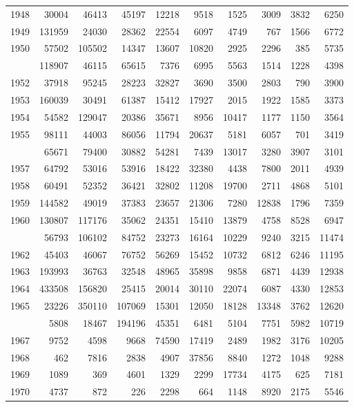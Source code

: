 \documentclass[
]{article}
\begin{document}
\begin{longtable}[t]{lrrrrrrrrr}
1948 & 30004 & 46413 & 45197 & 12218 & 9518 & 1525 & 3009 & 3832 & 6250\\
1949 & 131959 & 24030 & 28362 & 22554 & 6097 & 4749 & 767 & 1566 & 6772\\
1950 & 57502 & 105502 & 14347 & 13607 & 10820 & 2925 & 2296 & 385 & 5735\\
\addlinespace
1951 & 118907 & 46115 & 65615 & 7376 & 6995 & 5563 & 1514 & 1228 & 4398\\
1952 & 37918 & 95245 & 28223 & 32827 & 3690 & 3500 & 2803 & 790 & 3900\\
1953 & 160039 & 30491 & 61387 & 15412 & 17927 & 2015 & 1922 & 1585 & 3373\\
1954 & 54582 & 129047 & 20386 & 35671 & 8956 & 10417 & 1177 & 1150 & 3564\\
1955 & 98111 & 44003 & 86056 & 11794 & 20637 & 5181 & 6057 & 701 & 3419\\
\addlinespace
1956 & 65671 & 79400 & 30882 & 54281 & 7439 & 13017 & 3280 & 3907 & 3101\\
1957 & 64792 & 53016 & 53916 & 18422 & 32380 & 4438 & 7800 & 2011 & 4939\\
1958 & 60491 & 52352 & 36421 & 32802 & 11208 & 19700 & 2711 & 4868 & 5101\\
1959 & 144582 & 49019 & 37383 & 23657 & 21306 & 7280 & 12838 & 1796 & 7359\\
1960 & 130807 & 117176 & 35062 & 24351 & 15410 & 13879 & 4758 & 8528 & 6947\\
\addlinespace
1961 & 56793 & 106102 & 84752 & 23273 & 16164 & 10229 & 9240 & 3215 & 11474\\
1962 & 45403 & 46067 & 76752 & 56269 & 15452 & 10732 & 6812 & 6246 & 11195\\
1963 & 193993 & 36763 & 32548 & 48965 & 35898 & 9858 & 6871 & 4439 & 12938\\
1964 & 433508 & 156820 & 25415 & 20014 & 30110 & 22074 & 6087 & 4330 & 12853\\
1965 & 23226 & 350110 & 107069 & 15301 & 12050 & 18128 & 13348 & 3762 & 12620\\
\addlinespace
1966 & 5808 & 18467 & 194196 & 45351 & 6481 & 5104 & 7751 & 5982 & 10719\\
1967 & 9752 & 4598 & 9668 & 74590 & 17419 & 2489 & 1982 & 3176 & 10205\\
1968 & 462 & 7816 & 2838 & 4907 & 37856 & 8840 & 1272 & 1048 & 9288\\
1969 & 1089 & 369 & 4601 & 1329 & 2299 & 17734 & 4175 & 625 & 7181\\
1970 & 4737 & 872 & 226 & 2298 & 664 & 1148 & 8920 & 2175 & 5546\\

\end{longtable}
\end{document}
